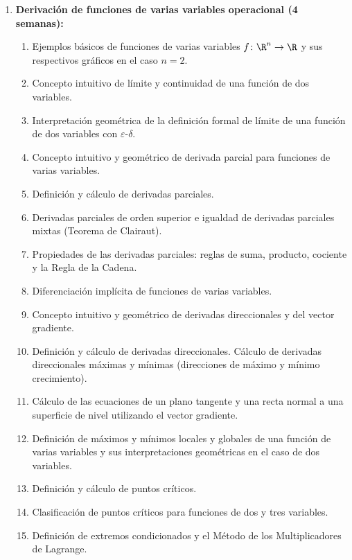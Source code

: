 \begin{refsection}
\begin{enumerate}
\item \textbf{Derivación de funciones de varias variables operacional (4 semanas):} 
\begin{enumerate}
    \item Ejemplos básicos de funciones de varias variables $f \colon \R^n \to \R$ y sus respectivos gráficos en el caso $n = 2$. 
    \item Concepto intuitivo de límite y continuidad de una función de dos variables.
    \item Interpretación geométrica de la definición formal de límite de una función de dos variables con $\varepsilon$-$\delta$.
    \item Concepto intuitivo y geométrico de derivada parcial para funciones de varias variables.
    \item Definición y cálculo de derivadas parciales.
    \item Derivadas parciales de orden superior e igualdad de derivadas parciales mixtas (Teorema de Clairaut).
    \item Propiedades de las derivadas parciales: reglas de suma, producto, cociente y la Regla de la Cadena.
    \item Diferenciación implícita de funciones de varias variables.
    \item Concepto intuitivo y geométrico de derivadas direccionales y del vector gradiente.
    \item Definición y cálculo de derivadas direccionales. Cálculo de derivadas direccionales máximas y mínimas (direcciones de máximo y mínimo crecimiento).
    \item Cálculo de las ecuaciones de un plano tangente y una recta normal a una superficie de nivel utilizando el vector gradiente.
    \item Definición de máximos y mínimos locales y globales de una función de varias variables y sus interpretaciones geométricas en el caso de dos variables.
    \item Definición y cálculo de puntos críticos.
    \item Clasificación de puntos críticos para funciones de dos y tres variables.
    \item Definición de extremos condicionados y el Método de los Multiplicadores de Lagrange.
\end{enumerate}


\end{enumerate}
\end{refsection}
